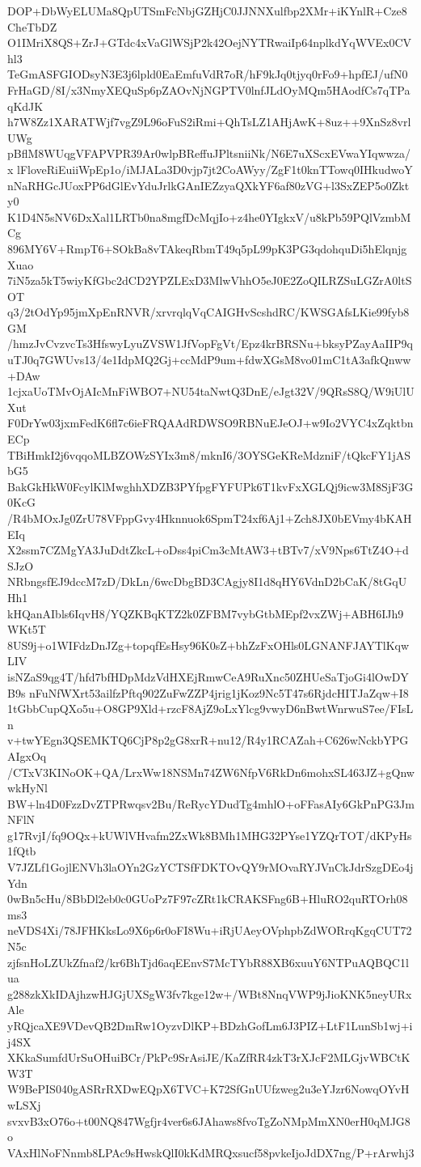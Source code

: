 DOP+DbWyELUMa8QpUTSmFcNbjGZHjC0JJNNXulfbp2XMr+iKYnlR+Cze8CheTbDZ
O1IMriX8QS+ZrJ+GTdc4xVaGlWSjP2k42OejNYTRwaiIp64nplkdYqWVEx0CVhl3
TeGmASFGIODsyN3E3j6lpld0EaEmfuVdR7oR/hF9kJq0tjyq0rFo9+hpfEJ/ufN0
FrHaGD/8I/x3NmyXEQuSp6pZAOvNjNGPTV0lnfJLdOyMQm5HAodfCs7qTPaqKdJK
h7W8Zz1XARATWjf7vgZ9L96oFuS2iRmi+QhTsLZ1AHjAwK+8uz++9XnSz8vrlUWg
pBflM8WUqgVFAPVPR39Ar0wlpBReffuJPltsniiNk/N6E7uXScxEVwaYIqwwza/x
lFloveRiEuiiWpEp1o/iMJALa3D0vjp7jt2CoAWyy/ZgF1t0knTTowq0IHkudwoY
nNaRHGcJUoxPP6dGlEvYduJrlkGAnIEZzyaQXkYF6af80zVG+l3SxZEP5o0Zkty0
K1D4N5sNV6DxXal1LRTb0na8mgfDcMqjIo+z4he0YIgkxV/u8kPb59PQlVzmbMCg
896MY6V+RmpT6+SOkBa8vTAkeqRbmT49q5pL99pK3PG3qdohquDi5hElqnjgXuao
7iN5za5kT5wiyKfGbc2dCD2YPZLExD3MlwVhhO5eJ0E2ZoQILRZSuLGZrA0ltSOT
q3/2tOdYp95jmXpEnRNVR/xrvrqlqVqCAIGHvScshdRC/KWSGAfsLKie99fyb8GM
/hmzJvCvzvcTs3HfswyLyuZVSW1JfVopFgVt/Epz4krBRSNu+bksyPZayAaIIP9q
uTJ0q7GWUvs13/4e1IdpMQ2Gj+ccMdP9um+fdwXGsM8vo01mC1tA3afkQnww+DAw
1cjxaUoTMvOjAIcMnFiWBO7+NU54taNwtQ3DnE/eJgt32V/9QRsS8Q/W9iUlUXut
F0DrYw03jxmFedK6fl7c6ieFRQAAdRDWSO9RBNuEJeOJ+w9Io2VYC4xZqktbnECp
TBiHmkI2j6vqqoMLBZOWzSYIx3m8/mknI6/3OYSGeKReMdzniF/tQkcFY1jASbG5
BakGkHkW0FcylKlMwghhXDZB3PYfpgFYFUPk6T1kvFxXGLQj9icw3M8SjF3G0KcG
/R4bMOxJg0ZrU78VFppGvy4Hknnuok6SpmT24xf6Aj1+Zch8JX0bEVmy4bKAHEIq
X2ssm7CZMgYA3JuDdtZkcL+oDss4piCm3cMtAW3+tBTv7/xV9Nps6TtZ4O+dSJzO
NRbngsfEJ9dccM7zD/DkLn/6wcDbgBD3CAgjy8I1d8qHY6VdnD2bCaK/8tGqUHh1
kHQanAIbls6IqvH8/YQZKBqKTZ2k0ZFBM7vybGtbMEpf2vxZWj+ABH6IJh9WKt5T
8US9j+o1WIFdzDnJZg+topqfEsHsy96K0sZ+bhZzFxOHls0LGNANFJAYTlKqwLIV
isNZaS9qg4T/hfd7bfHDpMdzVdHXEjRmwCeA9RuXnc50ZHUeSaTjoGi4lOwDYB9s
nFuNfWXrt53ailfzPftq902ZuFwZZP4jrig1jKoz9Nc5T47s6RjdcHITJaZqw+I8
1tGbbCupQXo5u+O8GP9Xld+rzcF8AjZ9oLxYlcg9vwyD6nBwtWnrwuS7ee/FIsLn
v+twYEgn3QSEMKTQ6CjP8p2gG8xrR+nu12/R4y1RCAZah+C626wNckbYPGAIgxOq
/CTxV3KINoOK+QA/LrxWw18NSMn74ZW6NfpV6RkDn6mohxSL463JZ+gQnwwkHyNl
BW+ln4D0FzzDvZTPRwqsv2Bu/ReRycYDudTg4mhlO+oFFasAIy6GkPnPG3JmNFlN
g17RvjI/fq9OQx+kUWlVHvafm2ZxWk8BMh1MHG32PYse1YZQrTOT/dKPyHs1fQtb
V7JZLf1GojlENVh3laOYn2GzYCTSfFDKTOvQY9rMOvaRYJVnCkJdrSzgDEo4jYdn
0wBn5cHu/8BbDl2eb0c0GUoPz7F97cZRt1kCRAKSFng6B+HluRO2quRTOrh08ms3
neVDS4Xi/78JFHKksLo9X6p6r0oFI8Wu+iRjUAeyOVphpbZdWORrqKgqCUT72N5c
zjfsnHoLZUkZfnaf2/kr6BhTjd6aqEEnvS7McTYbR88XB6xuuY6NTPuAQBQC1lua
g288zkXkIDAjhzwHJGjUXSgW3fv7kge12w+/WBt8NnqVWP9jJioKNK5neyURxAle
yRQjcaXE9VDevQB2DmRw1OyzvDlKP+BDzhGofLm6J3PIZ+LtF1LunSb1wj+ij4SX
XKkaSumfdUrSuOHuiBCr/PkPc9SrAsiJE/KaZfRR4zkT3rXJcF2MLGjvWBCtKW3T
W9BePIS040gASRrRXDwEQpX6TVC+K72SfGnUUfzweg2u3eYJzr6NowqOYvHwLSXj
svxvB3xO76o+t00NQ847Wgfjr4ver6s6JAhaws8fvoTgZoNMpMmXN0erH0qMJG8o
VAxHlNoFNnmb8LPAc9sHwskQlI0kKdMRQxsucf58pvkeIjoJdDX7ng/P+rArwhj3
